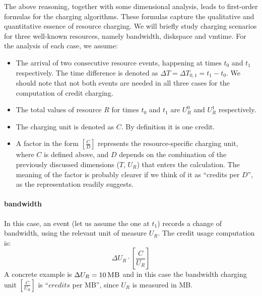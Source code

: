 \documentclass[letterpaper,twocolumn,10pt]{article}
\newcommand{\MB}[1]{\ensuremath{#1\,\mbox{\sc MB}}}
\begin{document}
The above reasoning, together with some dimensional analysis, leads to first-order formulas for the charging algorithms. These formulas capture the qualitative and quantitative essence of resource charging. We will briefly  study charging scenarios for three well-known resources, namely \textsf{bandwidth}, \textsf{diskspace} and \textsf{vmtime}. For the analysis of each case, we assume: 
\begin{itemize}
\item The arrival of two consecutive resource events, happening at times $t_0$ and $t_1$ respectively. The time difference is denoted as $\Delta T = \Delta T_{0, 1} = t_1 - t_0$. We should note that not both events are needed in all three cases for the computation of credit charging.

\item The total values of resource $R$ for times $t_0$ and $t_1$ are $U_R^0$ and $U_R^1$ respectively.

\item The charging unit is denoted as $C$. By definition it is one credit.

\item A factor in the form $[\frac{C}{D}]$ represents the resource-specific charging unit, where $C$ is defined above, and $D$ depends on the combination of the previously discussed dimensions ($T$, $U_R$) that enters the calculation. The meaning of the factor is probably clearer if we think of it as ``credits per $D$'', as the representation readily suggests.
\end{itemize}

\paragraph{\textsf{bandwidth}}
In this case, an event (let us assume the one at $t_1$) records a change of bandwidth, using the relevant unit of measure $U_R$.  The credit usage computation is:
\begin{equation}
\label{eq:bandwidth}
\Delta U_R \cdot  [ \frac{C}{U_R} ]
\end{equation}
A concrete example is $\Delta U_R = \MB{10}$ and in this case the bandwidth charging unit $[ \frac{C}{U_R} ]$ is ``$credits$ per {\sc MB}'', since $U_R$ is measured in {\sc MB}.
\end{document}
